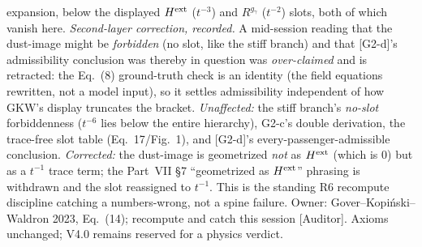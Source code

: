 \documentclass[11pt]{article}
\begin{document}
expansion, below the displayed $H^{\rm ext}$ ($t^{-3}$) and $R^{g_\gamma}$ ($t^{-2}$) slots, both of which vanish here. \emph{Second-layer correction, recorded.} A mid-session reading that the dust-image might be \emph{forbidden} (no slot, like the stiff branch) and that [G2-d]'s admissibility conclusion was thereby in question was \emph{over-claimed} and is retracted: the Eq.~(8) ground-truth check is an identity (the field equations rewritten, not a model input), so it settles admissibility independent of how GKW's display truncates the bracket. \emph{Unaffected:} the stiff branch's \emph{no-slot} forbiddenness ($t^{-6}$ lies below the entire hierarchy), G2-c's double derivation, the trace-free slot table (Eq.~17/Fig.~1), and [G2-d]'s every-passenger-admissible conclusion. \emph{Corrected:} the dust-image is geometrized \emph{not} as $H^{\rm ext}$ (which is $0$) but as a $t^{-1}$ trace term; the Part~VII \S7 ``geometrized as $H^{\rm ext}$'' phrasing is withdrawn and the slot reassigned to $t^{-1}$. This is the standing R6 recompute discipline catching a numbers-wrong, not a spine failure. Owner: Gover--Kopi\'nski--Waldron 2023, Eq.~(14); recompute and catch this session [Auditor]. Axioms unchanged; V4.0 remains reserved for a physics verdict.
\end{document}

